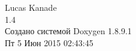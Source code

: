 \vspace*{7cm}
\begin{center}%
\LARGE {Lucas Kanade}\\\large{1.4}\\
\vspace*{1cm}
{\large Создано системой Doxygen 1.8.9.1}\\
\vspace*{0.5cm}
{\small Пт 5 Июн 2015 02:43:45}\\
\end{center}